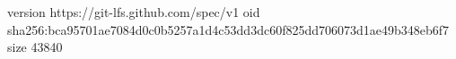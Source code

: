 version https://git-lfs.github.com/spec/v1
oid sha256:bca95701ae7084d0c0b5257a1d4c53dd3dc60f825dd706073d1ae49b348eb6f7
size 43840
